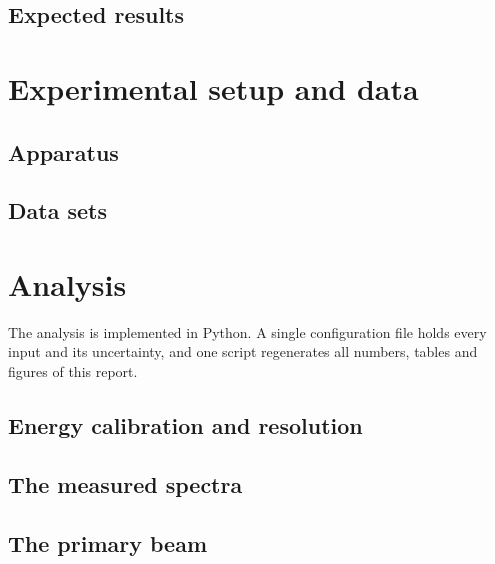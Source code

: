 \documentclass[aps,pra,reprint,superscriptaddress,nofootinbib,floatfix]{revtex4-2}
\begin{document}

\subsection{Expected results}


\section{Experimental setup and data}
\label{sec:setup}

\subsection{Apparatus}


\subsection{Data sets}


\section{Analysis}
\label{sec:analysis}

The analysis is implemented in Python. A single configuration file holds every input and its uncertainty, and one script regenerates all numbers, tables and figures of this report.

\subsection{Energy calibration and resolution}
\label{sec:calib}


\subsection{The measured spectra}
\label{sec:spectra}


\subsection{The primary beam}
\label{sec:beam}
\end{document}
